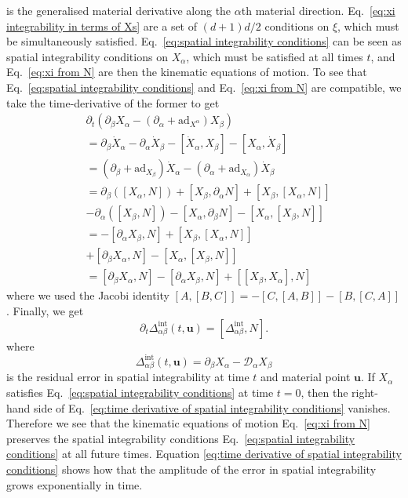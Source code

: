 is the generalised material derivative along the $\alpha$th material direction. Eq.~\ref{eq:xi integrability in terms of Xs} are a set of $(d+1)d/2$ conditions on $\xi$, which must be simultaneously satisfied. Eq.~\ref{eq:spatial integrability conditions} can be seen as spatial integrability conditions on $X_\alpha$, which must be satisfied at all times $t$, and Eq.~\ref{eq:xi from N} are then the kinematic equations of motion. To see that Eq.~\ref{eq:spatial integrability conditions} and Eq.~\ref{eq:xi from N} are compatible, we take the time-derivative of the former to get
\begin{equation}
\begin{aligned}
& \partial_t \left( \partial_\beta X_\alpha - ( \partial_\alpha + \text{ad}_{X^\alpha}) X_\beta \right) \\
&  =  \partial_\beta \dot{X}_\alpha - \partial_\alpha \dot{X}_\beta - [\dot{X}_\alpha, X_\beta] - [X_\alpha, \dot{X}_\beta] \\
& = (\partial_\beta + \text{ad}_{X_\beta}) \dot{X}_\alpha - (\partial_\alpha + \text{ad}_{X_\alpha}) \dot{X}_\beta \\
& = \partial_\beta( [X_\alpha, N]) + [X_\beta, \partial_\alpha N] + [X_\beta, [X_\alpha, N]] \\
& -   \partial_\alpha( [X_\beta, N]) - [X_\alpha, \partial_\beta N] - [X_\alpha, [X_\beta, N]] \\
& = - [ \partial_\alpha X_\beta, N] + [X_\beta, [X_\alpha, N]] \\
& +  [\partial_\beta X_\alpha,  N] - [X_\alpha, [X_\beta, N]] \\ 
& = [\partial_\beta X_\alpha,  N] - [ \partial_\alpha X_\beta, N] + [[X_\beta, X_\alpha], N]
\end{aligned}
\end{equation}
where we used the Jacobi identity $[A,[B,C]] = -[C, [A, B]] - [B, [C, A]]$. Finally, we get
\begin{equation} \label{eq:time derivative of spatial integrability conditions}
\partial_t \Delta^\text{int}_{\alpha \beta}(t, \mathbf{u}) = [ \Delta^\text{int}_{\alpha \beta}, N].
\end{equation}
where
\begin{equation}
	 \Delta^\text{int}_{\alpha \beta}(t, \mathbf{u}) = \partial_\beta X_\alpha - \mathcal{D}_\alpha X_\beta
\end{equation}
is the residual error in spatial integrability at time $t$ and material point $\mathbf{u}$. If $X_\alpha$ satisfies Eq.~\ref{eq:spatial integrability conditions} at time $t=0$, then the right-hand side of Eq.~\ref{eq:time derivative of spatial integrability conditions} vanishes. Therefore we see that the kinematic equations of motion Eq.~\ref{eq:xi from N} preserves the spatial integrability conditions Eq.~\ref{eq:spatial integrability conditions} at all future times. Equation \ref{eq:time derivative of spatial integrability conditions} shows how that the amplitude of the error in spatial integrability grows exponentially in time.

